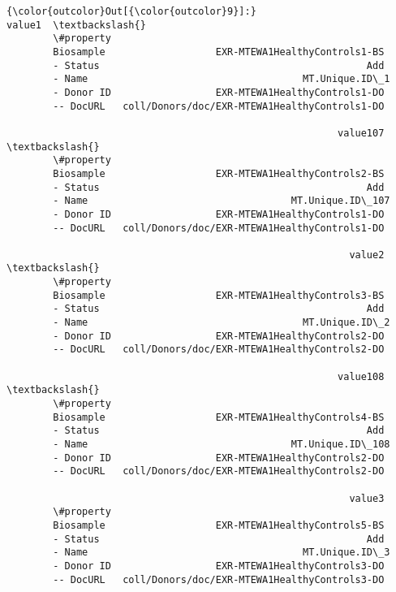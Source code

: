 \documentclass[11pt]{article}
\begin{document}
\begin{Verbatim}[commandchars=\\\{\}]
{\color{outcolor}Out[{\color{outcolor}9}]:}                                                    value1  \textbackslash{}
        \#property                                                   
        Biosample                   EXR-MTEWA1HealthyControls1-BS   
        - Status                                              Add   
        - Name                                     MT.Unique.ID\_1   
        - Donor ID                  EXR-MTEWA1HealthyControls1-DO   
        -- DocURL   coll/Donors/doc/EXR-MTEWA1HealthyControls1-DO   
        
                                                         value107  \textbackslash{}
        \#property                                                   
        Biosample                   EXR-MTEWA1HealthyControls2-BS   
        - Status                                              Add   
        - Name                                   MT.Unique.ID\_107   
        - Donor ID                  EXR-MTEWA1HealthyControls1-DO   
        -- DocURL   coll/Donors/doc/EXR-MTEWA1HealthyControls1-DO   
        
                                                           value2  \textbackslash{}
        \#property                                                   
        Biosample                   EXR-MTEWA1HealthyControls3-BS   
        - Status                                              Add   
        - Name                                     MT.Unique.ID\_2   
        - Donor ID                  EXR-MTEWA1HealthyControls2-DO   
        -- DocURL   coll/Donors/doc/EXR-MTEWA1HealthyControls2-DO   
        
                                                         value108  \textbackslash{}
        \#property                                                   
        Biosample                   EXR-MTEWA1HealthyControls4-BS   
        - Status                                              Add   
        - Name                                   MT.Unique.ID\_108   
        - Donor ID                  EXR-MTEWA1HealthyControls2-DO   
        -- DocURL   coll/Donors/doc/EXR-MTEWA1HealthyControls2-DO   
        
                                                           value3  
        \#property                                                  
        Biosample                   EXR-MTEWA1HealthyControls5-BS  
        - Status                                              Add  
        - Name                                     MT.Unique.ID\_3  
        - Donor ID                  EXR-MTEWA1HealthyControls3-DO  
        -- DocURL   coll/Donors/doc/EXR-MTEWA1HealthyControls3-DO  
\end{Verbatim}
            
\end{document}

